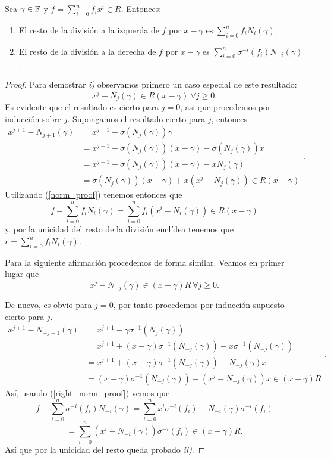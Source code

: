 \begin{lemma}
\label{lem:eval}
    Sea \(\gamma \in \mathbb{F}\) y  \(f = \sum_{i=0}^n f_ix^i \in R\). Entonces:
    \begin{enumerate}
    \item El resto de la división a la izquerda de \(f\) por  \(x - \gamma\) es  \(\sum_{i=0}^{n} f_i N_i(\gamma)\).
    \item El resto de la división a la derecha de \(f\) por  \(x - \gamma\) es  \(\sum_{i=0}^{n}\sigma^{-i}(f_i)N_{-i}(\gamma)\).
    \end{enumerate}
\end{lemma}
\begin{proof}
    Para demostrar \textit{i)} observamos primero un caso especial de este resultado:
\begin{equation}
\label{norm_proof}
    x^j - N_j(\gamma) \in R(x-\gamma)\ \forall j \geq 0.
\end{equation}
    Es evidente que el resultado es cierto para \(j = 0\), asi que procedemos por inducción sobre \(j\). Supongamos el resultado cierto para \(j\), entonces
\[
\begin{aligned}
x^{j+1} - N_{j+1}(\gamma) &= x^{j+1} - \sigma(N_j(\gamma))\gamma \\
&= x^{j+1} +  \sigma(N_j(\gamma))(x-\gamma) - \sigma(N_j(\gamma))x \\
&= x^{j+1} +  \sigma(N_j(\gamma))(x-\gamma) - xN_j(\gamma) \\
&= \sigma(N_j(\gamma))(x-\gamma) + x(x^{j} - N_j(\gamma)) \in R(x-\gamma)
\end{aligned}
.\]
Utilizando (\ref{norm_proof}) tenemos entonces que
\[
f - \sum_{i=0}^n f_i N_i(\gamma) = \sum_{i=0}^n f_i(x^i - N_i(\gamma)) \in R(x - \gamma)
\]
y, por la unicidad del resto de la división euclídea tenemos que \(r = \sum_{i=0}^n f_i N_i(\gamma)\).

Para la siguiente afirmación procedemos de forma similar. Veamos en primer lugar que
\begin{equation}
\label{right_norm_proof}
    x^j - N_{-j}(\gamma) \in (x-\gamma)R\ \forall j \geq 0.
\end{equation}

De nuevo, es obvio para \(j = 0\), por tanto procedemos por inducción supuesto cierto para \(j\).
\[
\begin{aligned}
x^{j+1} - N_{-j-1}(\gamma) &= x^{j+1} - \gamma\sigma^{-1}(N_j(\gamma))  \\
&= x^{j+1} +  (x-\gamma)\sigma^{-1}(N_{-j}(\gamma)) - x\sigma^{-1}(N_{-j}(\gamma)) \\
&= x^{j+1} + (x-\gamma)\sigma^{-1}(N_{-j}(\gamma)) - N_{-j}(\gamma)x \\
&= (x-\gamma)\sigma^{-1}(N_{-j}(\gamma)) + (x^{j} - N_{-j}(\gamma))x \in (x-\gamma)R
\end{aligned}
.\]
Así, usando (\ref{right_norm_proof}) vemos que
\[
f - \sum_{i=0}^n \sigma^{-i}(f_i) N_{-i}(\gamma) = \sum_{i=0}^n x^i\sigma^{-i}(f_i) - N_{-i}(\gamma)\sigma^{-i}(f_i)
\]
\[
= \sum_{i=0}^n (x^i - N_{-i}(\gamma))\sigma^{-i}(f_i) \in (x - \gamma)R
.\]
Así que por la unicidad del resto queda probado \textit{ii)}.
\end{proof}
